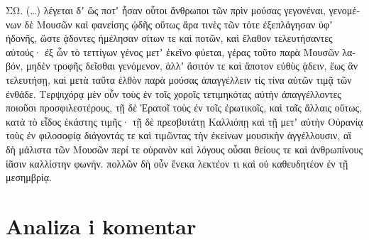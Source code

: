 \medskip


{\large

\begin{greek}

\noindent ΣΩ. (\dots) λέγεται δʼ ὥς ποτʼ ἦσαν οὗτοι ἄνθρωποι τῶν πρὶν μούσας γεγονέναι, γενομένων δὲ Μουσῶν καὶ φανείσης ᾠδῆς οὕτως ἄρα τινὲς τῶν τότε ἐξεπλάγησαν ὑφʼ ἡδονῆς, ὥστε ᾁδοντες ἠμέλησαν σίτων τε καὶ ποτῶν, καὶ ἔλαθον τελευτήσαντες αὑτούς· ἐξ ὧν τὸ τεττίγων γένος μετʼ ἐκεῖνο φύεται, γέρας τοῦτο παρὰ Μουσῶν λαβόν, μηδὲν τροφῆς δεῖσθαι γενόμενον, ἀλλʼ ἄσιτόν τε καὶ ἄποτον εὐθὺς ᾁδειν, ἕως ἂν τελευτήσῃ, καὶ μετὰ ταῦτα ἐλθὸν παρὰ μούσας ἀπαγγέλλειν τίς τίνα αὐτῶν τιμᾷ τῶν ἐνθάδε. Τερψιχόρᾳ μὲν οὖν τοὺς ἐν τοῖς χοροῖς τετιμηκότας αὐτὴν ἀπαγγέλλοντες ποιοῦσι προσφιλεστέρους, τῇ δὲ Ἐρατοῖ τοὺς ἐν τοῖς ἐρωτικοῖς, καὶ ταῖς ἄλλαις οὕτως, κατὰ τὸ εἶδος ἑκάστης τιμῆς· τῇ δὲ πρεσβυτάτῃ Καλλιόπῃ καὶ τῇ μετʼ αὐτὴν Οὐρανίᾳ τοὺς ἐν φιλοσοφίᾳ διάγοντάς τε καὶ τιμῶντας τὴν ἐκείνων μουσικὴν ἀγγέλλουσιν, αἳ δὴ μάλιστα τῶν Μουσῶν περί τε οὐρανὸν καὶ λόγους οὖσαι θείους τε καὶ ἀνθρωπίνους ἱᾶσιν καλλίστην φωνήν. πολλῶν δὴ οὖν ἕνεκα λεκτέον τι καὶ οὐ καθευδητέον ἐν τῇ μεσημβρίᾳ.
\end{greek}

}

\newpage

\section*{Analiza i komentar}


